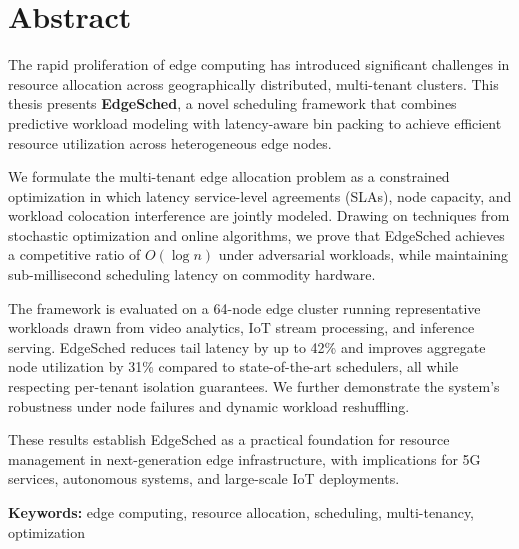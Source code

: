 \chapter*{Abstract}

The rapid proliferation of edge computing has introduced significant challenges in resource allocation across geographically distributed, multi-tenant clusters. This thesis presents \textbf{EdgeSched}, a novel scheduling framework that combines predictive workload modeling with latency-aware bin packing to achieve efficient resource utilization across heterogeneous edge nodes.

We formulate the multi-tenant edge allocation problem as a constrained optimization in which latency service-level agreements (SLAs), node capacity, and workload colocation interference are jointly modeled. Drawing on techniques from stochastic optimization and online algorithms, we prove that EdgeSched achieves a competitive ratio of \(O(\log n)\) under adversarial workloads, while maintaining sub-millisecond scheduling latency on commodity hardware.

The framework is evaluated on a 64-node edge cluster running representative workloads drawn from video analytics, IoT stream processing, and inference serving. EdgeSched reduces tail latency by up to 42\% and improves aggregate node utilization by 31\% compared to state-of-the-art schedulers, all while respecting per-tenant isolation guarantees. We further demonstrate the system's robustness under node failures and dynamic workload reshuffling.

These results establish EdgeSched as a practical foundation for resource management in next-generation edge infrastructure, with implications for 5G services, autonomous systems, and large-scale IoT deployments.

\vspace{\baselineskip}
\noindent\textbf{Keywords:} edge computing, resource allocation, scheduling, multi-tenancy, optimization
